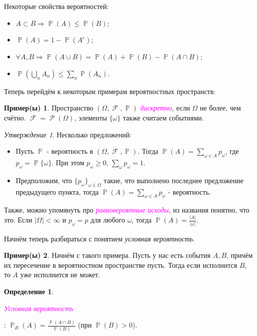 \documentclass[a4paper,100pt]{article}
\theoremstyle{indented}
\theoremstyle{definition}
\newtheorem{defn}{Определение}
\newtheorem{exl}{Пример(ы)}
\theoremstyle{remark}
\newtheorem{stat}{Утверждение}
\DeclareMathOperator{\PP}{\mathbb{P}}
\DeclareMathOperator{\FF}{\mathcal{F}}
\DeclareMathOperator{\Rho}{\mathcal{P}}
\begin{document}
Некоторые свойства вероятностей:

\begin{itemize}
    \item $A\subset B \Rightarrow \PP(A)\leq \PP(B)$;
    \item $\PP(A)=1-\PP(A^c)$;
    \item $\forall A, B \Rightarrow \PP(A\cup B)=\PP(A)+\PP(B)-\PP(A\cap B)$;
    \item $\PP(\bigcup_n A_n)\leq \sum_n \PP(A_n)$.
\end{itemize}

Теперь перейдём к некоторым примерам вероятностных пространств:

\begin{exl}

    Пространство $(\Omega, \FF, \PP)$ \hypertarget{n2}{\textcolor{magenta}{\textit{дискретно}}}, если $\Omega$ не более, чем счётно. $\FF=\Rho(\Omega)$, элементы $\{\omega\}$ также считаем событиями.
    \begin{stat}
        Несколько предложений:

        \begin{itemize}
            \item Пусть $\PP$ - вероятность в $(\Omega, \FF, \PP)$. Тогда $\PP(A)=\sum_{\omega\in A}p_\omega$, где $p_\omega=\PP\{\omega\}$. При этом $p_\omega\geq 0$, $\sum_\omega p_\omega = 1$. 
            \item Предположим, что $\{p_\omega\}_{\omega\in\Omega}$ такие, что выполнено последнее предложение предыдущего пункта, тогда $\PP(A)=\sum_{\omega\in A}p_\omega$ - вероятность.
        \end{itemize}
    \end{stat}
\end{exl}

Также, можно упомянуть про \hypertarget{n3}{\textcolor{magenta}{\textit{равновероятные исходы}}}, из названия понятно, что это. Если $\vert \Omega\vert <\infty$ и $p_\omega=p$ для любого $\omega$, тогда $\PP(A)=\frac{\vert A\vert}{\vert \omega \vert}$. \ 

Начнём теперь разбираться с понятием \textit{условная вероятность}.

\begin{exl}
    Начнём с такого примера. Пусть у нас есть события $A, B$, причём их пересечение в вероятностном пространстве пусть. Тогда если исполнится $B$, то $A$ уже исполнится не может.
\end{exl}

\begin{defn}
    \hypertarget{n4}{\textcolor{magenta}{\textit{Условная вероятность}}}: $\PP_B(A)=\frac{\PP(A\cap B)}{\PP(B)}$ (при $\PP(B)>0$).
\end{defn}
\end{document}
